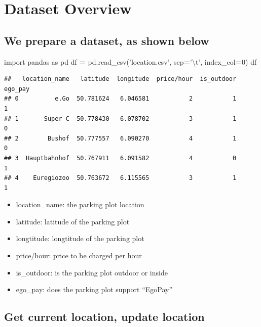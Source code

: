 \documentclass[]{book}
\newenvironment{Shaded}{\begin{snugshade}}{\end{snugshade}}
\newcommand{\CharTok}[1]{\textcolor[rgb]{0.31,0.60,0.02}{#1}}
\newcommand{\DecValTok}[1]{\textcolor[rgb]{0.00,0.00,0.81}{#1}}
\newcommand{\ImportTok}[1]{#1}
\newcommand{\NormalTok}[1]{#1}
\newcommand{\OperatorTok}[1]{\textcolor[rgb]{0.81,0.36,0.00}{\textbf{#1}}}
\newcommand{\StringTok}[1]{\textcolor[rgb]{0.31,0.60,0.02}{#1}}
\providecommand{\tightlist}{%
  \setlength{\itemsep}{0pt}\setlength{\parskip}{0pt}}
\begin{document}
\hypertarget{dataset-overview}{%
\chapter{Dataset Overview}\label{dataset-overview}}

\hypertarget{we-prepare-a-dataset-as-shown-below}{%
\section{We prepare a dataset, as shown below}\label{we-prepare-a-dataset-as-shown-below}}

\begin{Shaded}
\begin{Highlighting}[]
\ImportTok{import}\NormalTok{ pandas }\ImportTok{as}\NormalTok{ pd}
\NormalTok{df }\OperatorTok{=}\NormalTok{ pd.read_csv(}\StringTok{'location.csv'}\NormalTok{, sep}\OperatorTok{=}\StringTok{'}\CharTok{\textbackslash{}t}\StringTok{'}\NormalTok{, index_col}\OperatorTok{=}\DecValTok{0}\NormalTok{)}
\NormalTok{df}
\end{Highlighting}
\end{Shaded}

\begin{verbatim}
##   location_name   latitude  longitude  price/hour  is_outdoor  ego_pay
## 0          e.Go  50.781624   6.046581           2           1        1
## 1       Super C  50.778430   6.078702           3           1        0
## 2        Bushof  50.777557   6.090270           4           1        0
## 3  Hauptbahnhof  50.767911   6.091582           4           0        1
## 4    Euregiozoo  50.763672   6.115565           3           1        1
\end{verbatim}

\begin{itemize}
\tightlist
\item
  location\_name: the parking plot location
\item
  latitude: latitude of the parking plot
\item
  longtitude: longtitude of the parking plot
\item
  price/hour: price to be charged per hour
\item
  is\_outdoor: is the parking plot outdoor or inside
\item
  ego\_pay: does the parking plot support ``EgoPay''
\end{itemize}

\hypertarget{get-current-location-update-location}{%
\section{Get current location, update location}\label{get-current-location-update-location}}
\end{document}
